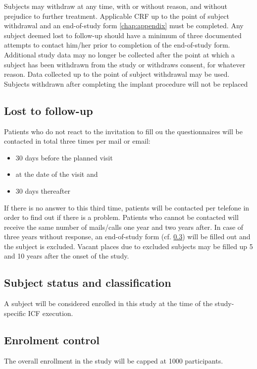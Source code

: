 Subjects may withdraw at any time, with or without reason, and without prejudice to further treatment. Applicable \ac{CRF} up to the point of subject withdrawal and an end-of-study form \ref{chap:appendix} must be completed. Any subject deemed lost to follow-up should have a minimum of three documented attempts to contact him/her prior to completion of the end-of-study form. Additional study data may no longer be collected after the point at which a subject has been withdrawn from the study or withdraws consent, for whatever reason. Data collected up to the point of subject withdrawal may be used. Subjects withdrawn after completing the implant procedure will not be replaced 

\subsection{Lost to follow-up}
Patients who do not react to the invitation to fill ou the questionnaires will be contacted in total three times per mail or email:
\begin{itemize}
\item 30 days before the planned visit
\item at the date of the visit and
\item 30 days thereafter
\end{itemize}
 If there is no answer to this third time, patients will be contacted per telefone in order to find out if there is a problem. Patients who cannot be contacted will receive the same number of mails/calls one year and two years after. In case of three years without response, an end-of-study form (cf. \ref{}) will be filled out and the subject is excluded. Vacant places due to excluded subjects may be filled up 5 and 10 years after the onset of the study.

\subsection{Subject status and classification}
A subject will be considered enrolled in this study at the time of the study-specific \ac{ICF} execution.

\subsection{Enrolment control}
The overall enrollment in the study will be capped at \num[round-precision = 0, round-mode = places]{1000} participants.

